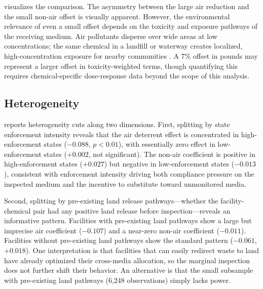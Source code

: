 \documentclass[12pt]{article}
\begin{document}
 visualizes the comparison. The asymmetry between the large air reduction and the small non-air offset is visually apparent. However, the environmental relevance of even a small offset depends on the toxicity and exposure pathways of the receiving medium. Air pollutants disperse over wide areas at low concentrations; the same chemical in a landfill or waterway creates localized, high-concentration exposure for nearby communities \citep{greenstone2012does, currie2020air}. A 7\% offset in pounds may represent a larger offset in toxicity-weighted terms, though quantifying this requires chemical-specific dose-response data beyond the scope of this analysis.

\subsection{Heterogeneity}



 reports heterogeneity cuts along two dimensions. First, splitting by state enforcement intensity reveals that the air deterrent effect is concentrated in high-enforcement states ($-0.088$, $p < 0.01$), with essentially zero effect in low-enforcement states ($+0.002$, not significant). The non-air coefficient is positive in high-enforcement states ($+0.027$) but negative in low-enforcement states ($-0.013$), consistent with enforcement intensity driving both compliance pressure on the inspected medium and the incentive to substitute toward unmonitored media.

Second, splitting by pre-existing land release pathways---whether the facility-chemical pair had any positive land release before inspection---reveals an informative pattern. Facilities with pre-existing land pathways show a large but imprecise air coefficient ($-0.107$) and a near-zero non-air coefficient ($-0.011$). Facilities without pre-existing land pathways show the standard pattern ($-0.061$, $+0.018$). One interpretation is that facilities that can easily redirect waste to land have already optimized their cross-media allocation, so the marginal inspection does not further shift their behavior. An alternative is that the small subsample with pre-existing land pathways (6,248 observations) simply lacks power.


\end{document}
